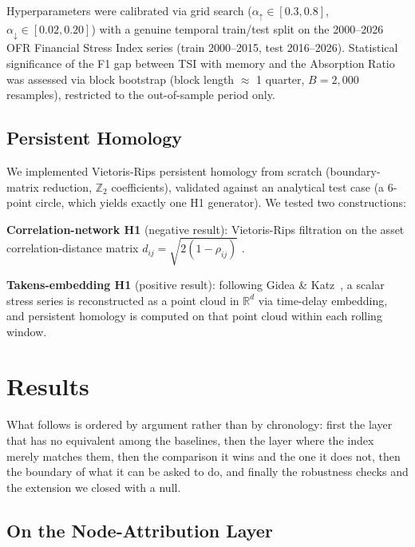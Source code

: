 \documentclass[11pt,a4paper]{article}
\begin{document}
Hyperparameters were calibrated via grid search
($\alpha_{\uparrow} \in [0.3, 0.8]$, $\alpha_{\downarrow} \in [0.02, 0.20]$)
with a genuine temporal train/test split on the 2000--2026 OFR Financial
Stress Index series (train 2000--2015, test 2016--2026). Statistical
significance of the F1 gap between TSI with memory and the Absorption
Ratio was assessed via block bootstrap (block length $\approx$ 1 quarter,
$B = 2{,}000$ resamples), restricted to the out-of-sample period only.


\subsection{Persistent Homology}

We implemented Vietoris-Rips persistent homology from scratch
(boundary-matrix reduction, $\mathbb{Z}_2$ coefficients), validated against
an analytical test case (a 6-point circle, which yields exactly one H1
generator). We tested two constructions:

\textbf{Correlation-network H1} (negative result): Vietoris-Rips filtration
on the asset correlation-distance matrix $d_{ij} = \sqrt{2(1-\rho_{ij})}$
\cite{mantegna1999}.

\textbf{Takens-embedding H1} (positive result): following Gidea \&
Katz~\cite{gidea2018}, a scalar stress series is reconstructed as a point
cloud in $\mathbb{R}^d$ via time-delay embedding, and persistent homology
is computed on that point cloud within each rolling window.


\section{Results}


What follows is ordered by argument rather than by chronology: first the
layer that has no equivalent among the baselines, then the layer where the
index merely matches them, then the comparison it wins and the one it does not,
then the boundary of what it can be asked to do, and finally the robustness
checks and the extension we closed with a null.

\subsection{On the Node-Attribution Layer}
\label{sec:attrib}
\end{document}
